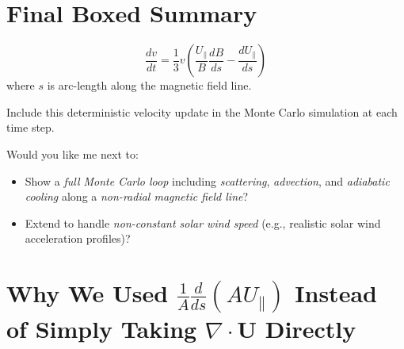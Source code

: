 \hrulefill

\section*{\texorpdfstring{ \textbf{Final Boxed Summary}}{}}

\[
\boxed{
\frac{dv}{dt} = \frac{1}{3} v \left( \frac{U_\parallel}{B} \frac{dB}{ds} - \frac{d U_\parallel}{ds} \right)
}
\]
where $s$ is arc-length along the magnetic field line.

Include this deterministic velocity update in the Monte Carlo simulation at each time step.

\hrulefill

Would you like me next to:
\begin{itemize}
    \item Show a \textit{full Monte Carlo loop} including \textit{scattering}, \textit{advection}, and \textit{adiabatic cooling} along a \textit{non-radial magnetic field line}?
    \item Extend to handle \textit{non-constant solar wind speed} (e.g., realistic solar wind acceleration profiles)?
\end{itemize}

\section*{Why We Used \texorpdfstring{$\displaystyle \frac{1}{A}\frac{d}{ds}(A U_\parallel)$}{} Instead of Simply Taking $\nabla\!\cdot\!\mathbf{U}$ Directly}

